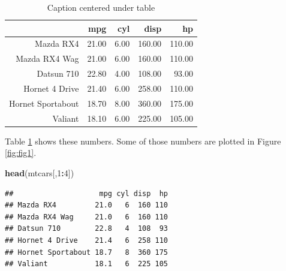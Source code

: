 \documentclass[useAMS,usenatbib,referee]{biom}
\newenvironment{Shaded}{\begin{snugshade}}{\end{snugshade}}
\newcommand{\DecValTok}[1]{\textcolor[rgb]{0.00,0.00,0.81}{#1}}
\newcommand{\KeywordTok}[1]{\textcolor[rgb]{0.13,0.29,0.53}{\textbf{#1}}}
\newcommand{\NormalTok}[1]{#1}
\newcommand{\OperatorTok}[1]{\textcolor[rgb]{0.81,0.36,0.00}{\textbf{#1}}}
\begin{document}
\begin{table}[ht]
\centering
\caption{Caption centered under table} 
\label{tab1}
\begin{tabular}{rrrrr}
  \hline
 & mpg & cyl & disp & hp \\ 
  \hline
Mazda RX4 & 21.00 & 6.00 & 160.00 & 110.00 \\ 
  Mazda RX4 Wag & 21.00 & 6.00 & 160.00 & 110.00 \\ 
  Datsun 710 & 22.80 & 4.00 & 108.00 & 93.00 \\ 
  Hornet 4 Drive & 21.40 & 6.00 & 258.00 & 110.00 \\ 
  Hornet Sportabout & 18.70 & 8.00 & 360.00 & 175.00 \\ 
  Valiant & 18.10 & 6.00 & 225.00 & 105.00 \\ 
   \hline
\end{tabular}
\end{table}

Table \ref{tab1} shows these numbers. Some of those numbers are plotted
in Figure \ref{fig:fig1}.

\begin{Shaded}
\begin{Highlighting}[]
\KeywordTok{head}\NormalTok{(mtcars[,}\DecValTok{1}\OperatorTok{:}\DecValTok{4}\NormalTok{])}
\end{Highlighting}
\end{Shaded}

\begin{verbatim}
##                    mpg cyl disp  hp
## Mazda RX4         21.0   6  160 110
## Mazda RX4 Wag     21.0   6  160 110
## Datsun 710        22.8   4  108  93
## Hornet 4 Drive    21.4   6  258 110
## Hornet Sportabout 18.7   8  360 175
## Valiant           18.1   6  225 105
\end{verbatim}






\label{lastpage}
\end{document}
